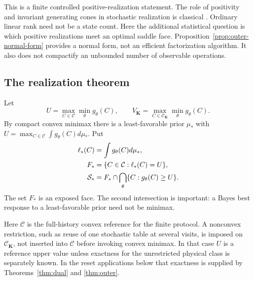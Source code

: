 This is a finite controlled positive-realization statement. The role of
positivity and invariant generating cones in stochastic realization is
classical \cite{Heller,Vidyasagar,GG}. Ordinary linear rank need not be a
state count. Here the additional statistical question is which positive
realizations meet an optimal saddle face. Proposition~\ref{prop:outer-normal-form}
provides a normal form, not an efficient factorization algorithm. It
also does not compactify an unbounded number of observable operations.

\subsection{The realization theorem}
Let
\[
 U=\max_{C\in\mathcal C}\min_{\theta}g_\theta(C),\qquad
 V_{\mathbf K}=\max_{C\in\mathcal C_{\mathbf K}}
                                      \min_\theta g_\theta(C).
\]
By compact convex minimax there is a least-favorable prior $\mu_*$ with
$U=\max_{C\in\mathcal C}\int g_\theta(C)d\mu_*$. Put
\begin{align}
 \ell_*(C)&=\int g_\theta(C)d\mu_*,\notag\\
 F_*&=\{C\in\mathcal C:\ell_*(C)=U\},\notag\\
 \mathcal S_*&=F_*\cap
             \bigcap_{\theta}\{C:g_\theta(C)\ge U\}.\label{eq:saddle-face}
\end{align}
The set $F_*$ is an exposed face. The second intersection is important:
a Bayes best response to a least-favorable prior need not be minimax.

Here $\mathcal C$ is the full-history convex reference for the finite
protocol. A nonconvex restriction, such as reuse of one stochastic table
at several visits, is imposed on $\mathcal C_{\mathbf K}$, not inserted
into $\mathcal C$ before invoking convex minimax. In that case $U$ is a
reference upper value unless exactness for the unrestricted physical
class is separately known. In the reset applications below that
exactness is supplied by Theorems~\ref{thm:dual} and \ref{thm:outer}.



